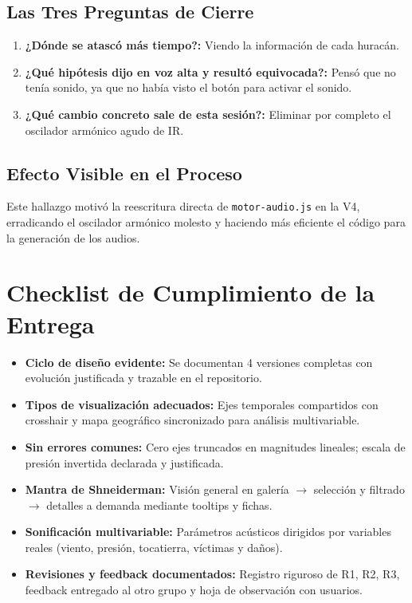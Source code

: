 \documentclass[11pt,a4paper]{article}
\begin{document}
	\subsection{Las Tres Preguntas de Cierre}
	\begin{enumerate}
		\item \textbf{¿Dónde se atascó más tiempo?:} Viendo la información de cada huracán.
		\item \textbf{¿Qué hipótesis dijo en voz alta y resultó equivocada?:} Pensó que no tenía sonido, ya que no había visto el botón para activar el sonido.
		\item \textbf{¿Qué cambio concreto sale de esta sesión?:} Eliminar por completo el oscilador armónico agudo de IR.
	\end{enumerate}
	
	\subsection{Efecto Visible en el Proceso}
	Este hallazgo motivó la reescritura directa de \texttt{motor-audio.js} en la V4, erradicando el oscilador armónico molesto y haciendo más eficiente el código para la generación de los audios.
	
	\vspace{0.4cm}
	
	\section{Checklist de Cumplimiento de la Entrega}
	
	\begin{metabox}
		\begin{itemize}
			\item[\checkmark] \textbf{Ciclo de diseño evidente:} Se documentan 4 versiones completas con evolución justificada y trazable en el repositorio.
			\item[\checkmark] \textbf{Tipos de visualización adecuados:} Ejes temporales compartidos con crosshair y mapa geográfico sincronizado para análisis multivariable.
			\item[\checkmark] \textbf{Sin errores comunes:} Cero ejes truncados en magnitudes lineales; escala de presión invertida declarada y justificada.
			\item[\checkmark] \textbf{Mantra de Shneiderman:} Visión general en galería $\rightarrow$ selección y filtrado $\rightarrow$ detalles a demanda mediante tooltips y fichas.
			\item[\checkmark] \textbf{Sonificación multivariable:} Parámetros acústicos dirigidos por variables reales (viento, presión, tocatierra, víctimas y daños).
			\item[\checkmark] \textbf{Revisiones y feedback documentados:} Registro riguroso de R1, R2, R3, feedback entregado al otro grupo y hoja de observación con usuarios.
		\end{itemize}
	\end{metabox}
	
\end{document}
